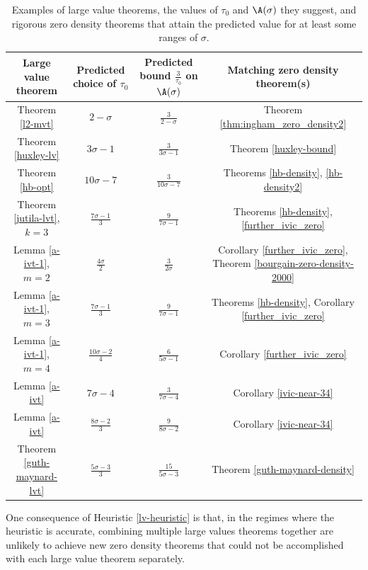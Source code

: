\begin{table}[ht]
    \def\arraystretch{1.3}
    \centering
    \caption{Examples of large value theorems, the values of $\tau_0$ and $\A(\sigma)$ they suggest, and rigorous zero density theorems that attain the predicted value for at least some ranges of $\sigma$.}
    \begin{tabular}{|c|c|c|c|}
    \hline
    Large value theorem & Predicted choice of $\tau_0$ & Predicted bound $\frac{3}{\tau_0}$ on $\A(\sigma)$ & Matching zero density theorem(s)\\
    \hline
    Theorem \ref{l2-mvt} & $2-\sigma$ & $\frac{3}{2-\sigma}$ & Theorem \ref{thm:ingham_zero_density2}\\
    \hline
    Theorem \ref{huxley-lv} & $3\sigma-1$ & $\frac{3}{3\sigma-1}$ & Theorem \ref{huxley-bound} \\
    \hline
    Theorem \ref{hb-opt} & $10\sigma-7$ & $\frac{3}{10\sigma-7}$ & Theorems \ref{hb-density}, \ref{hb-density2} \\
    \hline
    Theorem \ref{jutila-lvt}, $k=3$ & $\frac{7\sigma-1}{3}$ & $\frac{9}{7\sigma-1}$ & Theorems \ref{hb-density}, \ref{further_ivic_zero} \\
    \hline
    Lemma \ref{a-ivt-1}, $m=2$ & $\frac{4\sigma}{2}$ & $\frac{3}{2\sigma}$ & Corollary \ref{further_ivic_zero}, Theorem \ref{bourgain-zero-density-2000} \\
    \hline
    Lemma \ref{a-ivt-1}, $m=3$ & $\frac{7\sigma-1}{3}$ & $\frac{9}{7\sigma-1}$ & Theorems \ref{hb-density}, Corollary \ref{further_ivic_zero} \\
    \hline
    Lemma \ref{a-ivt-1}, $m=4$ & $\frac{10\sigma-2}{4}$ & $\frac{6}{5\sigma-1}$ & Corollary \ref{further_ivic_zero} \\
    \hline
    Lemma \ref{a-ivt} & $7\sigma-4$ & $\frac{3}{7\sigma-4}$ & Corollary \ref{ivic-near-34} \\
    \hline
    Lemma \ref{a-ivt} & $\frac{8\sigma-2}{3}$ & $\frac{9}{8\sigma-2}$ & Corollary \ref{ivic-near-34} \\
    \hline
    Theorem \ref{guth-maynard-lvt} & $\frac{5\sigma-3}{3}$ & $\frac{15}{5\sigma-3}$ & Theorem \ref{guth-maynard-density} \\
    \hline
    \end{tabular}
    \label{zero_density_heuristic}
    \end{table}

    One consequence of Heuristic \ref{lv-heuristic} is that, in the regimes where the heuristic is accurate, combining multiple large values theorems together are unlikely to achieve new zero density theorems that could not be accomplished with each large value theorem separately.

